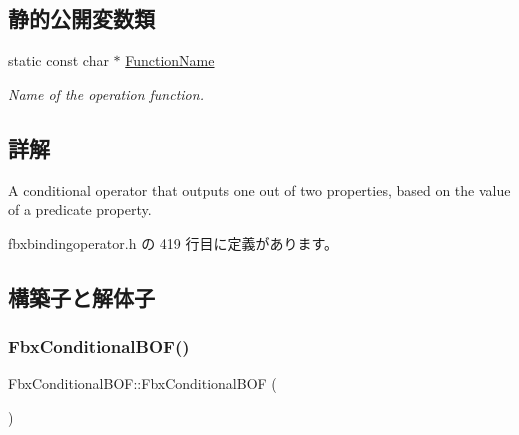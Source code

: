 \subsection*{静的公開変数類}
\begin{DoxyCompactItemize}
\item 
static const char $\ast$ \hyperlink{class_fbx_conditional_b_o_f_ac0653f2120f3d07ea7c308611b9f2bbc}{Function\+Name}
\begin{DoxyCompactList}\small\item\em Name of the operation function. \end{DoxyCompactList}\end{DoxyCompactItemize}


\subsection{詳解}
A conditional operator that outputs one out of two properties, based on the value of a predicate property. 

 fbxbindingoperator.\+h の 419 行目に定義があります。



\subsection{構築子と解体子}
\mbox{\label{class_fbx_conditional_b_o_f_ab01caa5b426f06735e3729f9c59ff58e}} 
\subsubsection{\texorpdfstring{Fbx\+Conditional\+B\+O\+F()}{FbxConditionalBOF()}}
{\footnotesize\ttfamily Fbx\+Conditional\+B\+O\+F\+::\+Fbx\+Conditional\+B\+OF (\begin{DoxyParamCaption}{ }\end{DoxyParamCaption})}

\mbox{\label{class_fbx_conditional_b_o_f_aa4c2e32bdf6550a9c1f36c1f0490bb3a}} 
